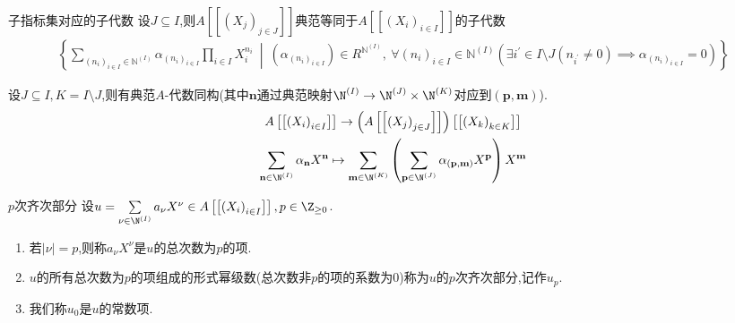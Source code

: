 \begin{proposition}{子指标集对应的子代数}{}
	设$J\subseteq I$,则$A\left[\left[\left(X_{j}\right)_{j\in J}\right]\right]$典范等同于$A\left[\left[\left(X_{i}\right)_{i\in I}\right]\right]$的子代数
	\begin{align*}
		\left\{\sum\limits_{\left(n_{i}\right)_{i\in I}\in \mathbb{N}^{\left(I\right)}}\alpha_{\left(n_{i}\right)_{i\in I}}\prod\limits_{i\in I}X_{i}^{n_{i}}\ \middle|\ \left(\alpha_{\left(n_i\right)_{i\in I}}\right)\in R^{\mathbb{N}^{(I)}},\ \forall\left(n_{i}\right)_{i\in I}\in\mathbb{N}^{\left(I\right)}\left(\exists i^{\prime}\in I\setminus J\left(n_{i^{\prime}}\neq 0\right)\implies\alpha_{\left(n_{i}\right)_{i\in I}}=0\right)\right\}
	\end{align*}
\end{proposition}

\begin{proposition}{}{}
	设$J\subseteq I,K=I\setminus J$,则有典范$A$-代数同构(其中$\mathbf{n}$通过典范映射$\N^{\left(I\right)}\to\N^{\left(J\right)}\times\N^{\left(K\right)}$对应到$\left(\mathbf{p},\mathbf{m}\right)$).
	\begin{gather*}
		A\left[\left[\left(X_{i}\right)_{i\in I}\right]\right]\to\left(A\left[\left[\left(X_{j}\right)_{j\in J}\right]\right]\right)\left[\left[\left(X_{k}\right)_{k\in K}\right]\right]\\
		\sum\limits_{\mathbf{n}\in\N^{\left(I\right)}}\alpha_{\mathbf{n}}X^{\mathbf{n}}\mapsto\sum\limits_{\mathbf{m}\in\N^{\left(K\right)}}\left(\sum\limits_{\mathbf{p}\in\N^{\left(J\right)}}\alpha_{\left(\mathbf{p},\mathbf{m}\right)}X^{\mathbf{p}}\right)X^{\mathbf{m}}
	\end{gather*}
\end{proposition}

\begin{definition}{$p$次齐次部分}{}
	设$u=\sum\limits_{\nu\in\N^{\left(I\right)}}a_{\nu}X^{\nu}\in A\left[\left[\left(X_{i}\right)_{i\in I}\right]\right],p\in\Z_{\geq 0}$.
	\begin{enumerate}
		\item 若$\left|\nu\right|=p$,则称$a_{\nu}X^{\nu}$是$u$的总次数为$p$的项.
		\item $u$的所有总次数为$p$的项组成的形式幂级数(总次数非$p$的项的系数为$0$)称为$u$的$p$次齐次部分,记作$u_{p}$.
		\item 我们称$u_{0}$是$u$的常数项.
	\end{enumerate}
\end{definition}

